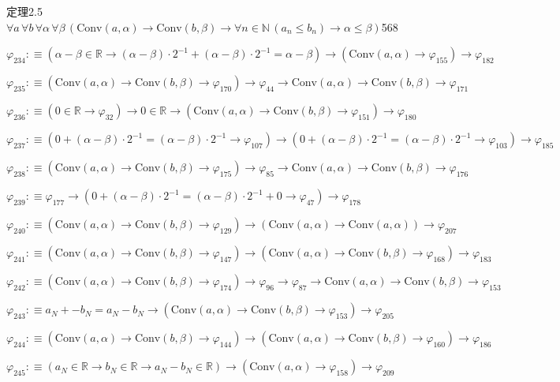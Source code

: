 \begin{fullproof}{定理2.5}{$\forall a\,\forall b\,\forall \alpha\,\forall \beta\,(\mathrm{Conv}(a,\alpha) \to \mathrm{Conv}(b,\beta) \to \forall n \in \mathbb{N}\,(a_{n} \leq b_{n}) \to \alpha \leq \beta)$}{568}
\begin{abbrevlist}
\item $\varphi_{234} :\equiv (\alpha - \beta \in \mathbb{R} \to (\alpha - \beta) \cdot 2^{-1} + (\alpha - \beta) \cdot 2^{-1} = \alpha - \beta) \to (\mathrm{Conv}(a,\alpha) \to \varphi_{155}) \to \varphi_{182}$
\item $\varphi_{235} :\equiv (\mathrm{Conv}(a,\alpha) \to \mathrm{Conv}(b,\beta) \to \varphi_{170}) \to \varphi_{44} \to \mathrm{Conv}(a,\alpha) \to \mathrm{Conv}(b,\beta) \to \varphi_{171}$
\item $\varphi_{236} :\equiv (0 \in \mathbb{R} \to \varphi_{32}) \to 0 \in \mathbb{R} \to (\mathrm{Conv}(a,\alpha) \to \mathrm{Conv}(b,\beta) \to \varphi_{151}) \to \varphi_{180}$
\item $\varphi_{237} :\equiv (0 + (\alpha - \beta) \cdot 2^{-1} = (\alpha - \beta) \cdot 2^{-1} \to \varphi_{107}) \to (0 + (\alpha - \beta) \cdot 2^{-1} = (\alpha - \beta) \cdot 2^{-1} \to \varphi_{103}) \to \varphi_{185}$
\item $\varphi_{238} :\equiv (\mathrm{Conv}(a,\alpha) \to \mathrm{Conv}(b,\beta) \to \varphi_{175}) \to \varphi_{85} \to \mathrm{Conv}(a,\alpha) \to \mathrm{Conv}(b,\beta) \to \varphi_{176}$
\item $\varphi_{239} :\equiv \varphi_{177} \to (0 + (\alpha - \beta) \cdot 2^{-1} = (\alpha - \beta) \cdot 2^{-1} + 0 \to \varphi_{47}) \to \varphi_{178}$
\item $\varphi_{240} :\equiv (\mathrm{Conv}(a,\alpha) \to \mathrm{Conv}(b,\beta) \to \varphi_{129}) \to (\mathrm{Conv}(a,\alpha) \to \mathrm{Conv}(a,\alpha)) \to \varphi_{207}$
\item $\varphi_{241} :\equiv (\mathrm{Conv}(a,\alpha) \to \mathrm{Conv}(b,\beta) \to \varphi_{147}) \to (\mathrm{Conv}(a,\alpha) \to \mathrm{Conv}(b,\beta) \to \varphi_{168}) \to \varphi_{183}$
\item $\varphi_{242} :\equiv (\mathrm{Conv}(a,\alpha) \to \mathrm{Conv}(b,\beta) \to \varphi_{174}) \to \varphi_{96} \to \varphi_{87} \to \mathrm{Conv}(a,\alpha) \to \mathrm{Conv}(b,\beta) \to \varphi_{153}$
\item $\varphi_{243} :\equiv a_{N} + -b_{N} = a_{N} - b_{N} \to (\mathrm{Conv}(a,\alpha) \to \mathrm{Conv}(b,\beta) \to \varphi_{153}) \to \varphi_{205}$
\item $\varphi_{244} :\equiv (\mathrm{Conv}(a,\alpha) \to \mathrm{Conv}(b,\beta) \to \varphi_{144}) \to (\mathrm{Conv}(a,\alpha) \to \mathrm{Conv}(b,\beta) \to \varphi_{160}) \to \varphi_{186}$
\item $\varphi_{245} :\equiv (a_{N} \in \mathbb{R} \to b_{N} \in \mathbb{R} \to a_{N} - b_{N} \in \mathbb{R}) \to (\mathrm{Conv}(a,\alpha) \to \varphi_{158}) \to \varphi_{209}$

\end{abbrevlist}
\end{fullproof}
